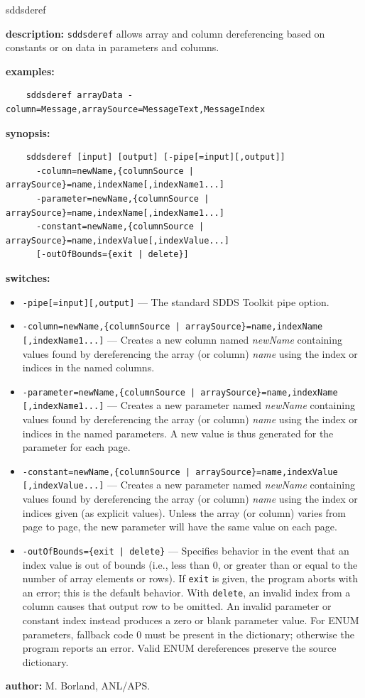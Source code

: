 \begin{sddsprog}{sddsderef}
  \item \textbf{description:} \verb|sddsderef| allows array and column dereferencing based on constants or on data in parameters and columns.
  \item \textbf{examples:}
    \begin{verbatim}
    sddsderef arrayData -column=Message,arraySource=MessageText,MessageIndex
    \end{verbatim}
  \item \textbf{synopsis:}
    \begin{verbatim}
    sddsderef [input] [output] [-pipe[=input][,output]]
      -column=newName,{columnSource | arraySource}=name,indexName[,indexName1...]
      -parameter=newName,{columnSource | arraySource}=name,indexName[,indexName1...]
      -constant=newName,{columnSource | arraySource}=name,indexValue[,indexValue...]
      [-outOfBounds={exit | delete}]
    \end{verbatim}
  \item \textbf{switches:}
    \begin{itemize}
      \item \verb|-pipe[=input][,output]| --- The standard SDDS Toolkit pipe option.
      \item \verb!-column=newName,{columnSource | arraySource}=name,indexName! \verb|[,indexName1...]| --- Creates a new column named \emph{newName} containing values found by dereferencing the array (or column) \emph{name} using the index or indices in the named columns.
      \item \verb!-parameter=newName,{columnSource | arraySource}=name,indexName! \verb|[,indexName1...]| --- Creates a new parameter named \emph{newName} containing values found by dereferencing the array (or column) \emph{name} using the index or indices in the named parameters. A new value is thus generated for the parameter for each page.
      \item \verb!-constant=newName,{columnSource | arraySource}=name,indexValue! \verb|[,indexValue...]| --- Creates a new parameter named \emph{newName} containing values found by dereferencing the array (or column) \emph{name} using the index or indices given (as explicit values). Unless the array (or column) varies from page to page, the new parameter will have the same value on each page.
      \item \verb!-outOfBounds={exit | delete}! --- Specifies behavior in the event that an index value is out of bounds (i.e., less than 0, or greater than or equal to the number of array elements or rows). If \verb|exit| is given, the program aborts with an error; this is the default behavior. With \verb|delete|, an invalid index from a column causes that output row to be omitted. An invalid parameter or constant index instead produces a zero or blank parameter value. For ENUM parameters, fallback code 0 must be present in the dictionary; otherwise the program reports an error. Valid ENUM dereferences preserve the source dictionary.
    \end{itemize}
  \item \textbf{author:} M. Borland, ANL/APS.
\end{sddsprog}
